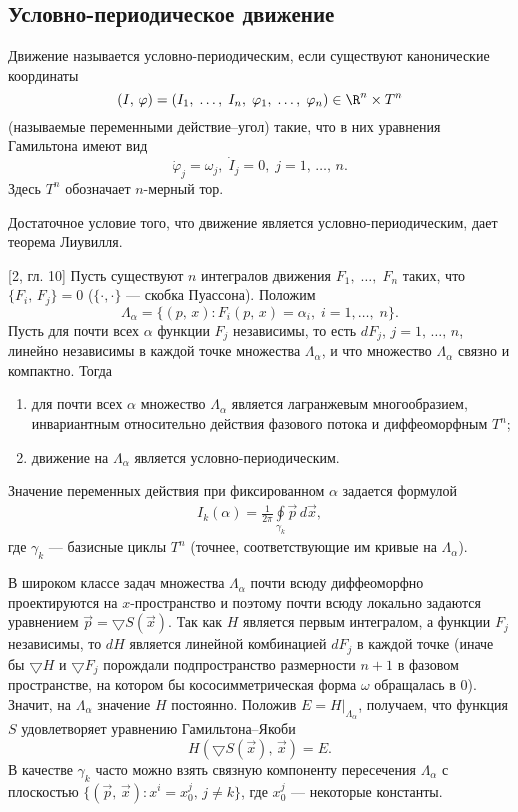 \documentclass[a4paper
]{article}
\begin{document}
\subsection{Условно-периодическое движение}
Движение называется условно-периодическим, если существуют канонические
координаты
$$(I, \, \varphi)=(I_1, \; \dots,\; I_n, \; \varphi_1, \; \dots, \;
\varphi_n)\in \R^n\times T^n$$ (называемые переменными действие--угол)
такие, что в них уравнения Гамильтона имеют вид
$$\dot{\varphi}_j=\omega_j, \; \dot{I}_j=0, \; j=1, \, \dots, \, n.$$
Здесь $T^n$ обозначает $n$-мерный тор. \par
Достаточное условие того, что движение является условно-периодическим,
дает теорема Лиувилля.
\begin{Trm}
{\rm [2, гл. 10]} Пусть существуют $n$ интегралов движения $F_1, \;
\dots, \; F_n$ таких, что $\{F_i, \, F_j\}=0$ ($\{\cdot, \cdot\}$ ---
скобка Пуассона). Положим $$\Lambda_\alpha=\{(p, \, x):F_i(p, \, x)=\alpha_i,
\; i=1, \dots, \; n\}.$$ Пусть для почти всех $\alpha$
функции $F_j$ независимы, то есть $dF_j$, $j=1, \, \dots, \, n$, линейно
независимы в каждой точке множества $\Lambda_\alpha$, и что множество $\Lambda_\alpha$
связно и компактно. Тогда
\begin{enumerate}
\item для почти всех $\alpha$ множество $\Lambda_\alpha$ является лагранжевым
многообразием, инвариантным относительно действия фазового потока и
диффеоморфным $T^n$;
\item движение на $\Lambda_\alpha$ является условно-периодическим.
\end{enumerate}
\end{Trm}
Значение переменных действия при фиксированном $\alpha$ задается формулой
\begin{align}
\label{1ik}
I_k(\alpha)=\frac{1}{2\pi}\oint \limits_{\gamma_k}\vec p\, d\vec x,
\end{align}
где $\gamma_k$ --- базисные циклы $T^n$ (точнее, соответствующие им кривые
на $\Lambda_\alpha$). \par
В широком классе задач множества $\Lambda_\alpha$ почти всюду диффеоморфно
проектируются на $x$-пространство и поэтому почти всюду локально задаются
уравнением $\vec p=\bigtriangledown S(\vec x)$. Так как $H$ является
первым интегралом, а функции $F_j$ независимы, то $dH$ является
линейной комбинацией $dF_j$ в каждой точке (иначе бы $\bigtriangledown
H$ и $\bigtriangledown F_j$ порождали подпространство размерности
$n+1$ в фазовом пространстве, на котором бы кососимметрическая форма
$\omega$ обращалась в 0). Значит, на $\Lambda_\alpha$ значение $H$
постоянно. Положив $E=H|_{\Lambda_\alpha}$, получаем, что функция $S$
удовлетворяет уравнению Гамильтона--Якоби $$H(\bigtriangledown S(\vec x),
\, \vec x)=E.$$
В качестве $\gamma_k$ часто можно взять связную компоненту пересечения
$\Lambda_\alpha$ с плоскостью $\{(\vec p, \, \vec x):x^i=x^j_0, \,
j\ne k\}$, где $x^j_0$ --- некоторые константы.
\end{document}
